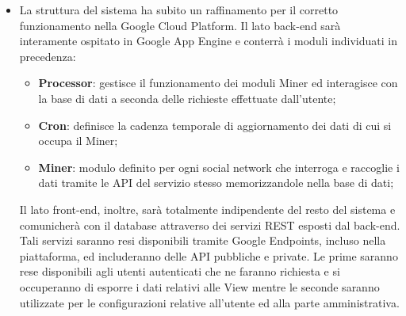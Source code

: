\begin{itemize}
  	\item La struttura del sistema ha subito un raffinamento per il corretto funzionamento nella Google Cloud Platform.
  Il lato back-end sarà interamente ospitato in Google App Engine e conterrà i moduli individuati in precedenza:
  	\begin{itemize}
    	\item \textbf{Processor}: gestisce il funzionamento dei moduli Miner ed interagisce con la base di dati a seconda delle richieste effettuate dall'utente;
    	\item \textbf{Cron}: definisce la cadenza temporale di aggiornamento dei dati di cui si occupa il Miner;
    	\item \textbf{Miner}: modulo definito per ogni social network che interroga e raccoglie i dati tramite le API del servizio stesso memorizzandole nella base di dati;
	\end{itemize}
  Il lato front-end, inoltre, sarà totalmente indipendente del resto del sistema e comunicherà con il database attraverso dei servizi REST esposti dal back-end. Tali servizi saranno resi disponibili tramite Google Endpoints, incluso nella piattaforma, ed includeranno delle API pubbliche e private. Le prime saranno rese disponibili agli utenti autenticati che ne faranno richiesta e si occuperanno di esporre i dati relativi alle View mentre le seconde saranno utilizzate per le configurazioni relative all'utente ed alla parte amministrativa.


\end{itemize}
